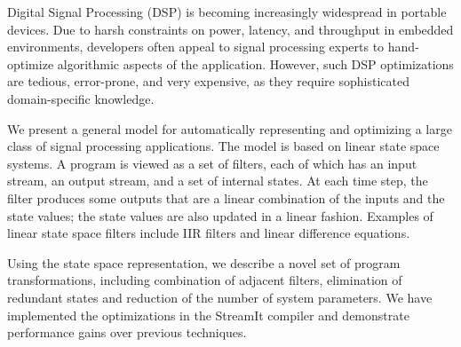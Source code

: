 Digital Signal Processing (DSP) is becoming increasingly wide\-spread
in portable devices. Due to harsh constraints on power, latency, and
throughput in embedded environments, developers often appeal to signal
processing experts to hand-optimize algorithmic aspects of the
application.  However, such DSP optimizations are tedious,
error-prone, and very expensive, as they require sophisticated
domain-specific knowledge.

We present a general model for automatically representing and
optimizing a large class of signal processing applications. The model
is based on linear state space systems. A program is viewed as a set
of filters, each of which has an input stream, an output stream, and a
set of internal states. At each time step, the filter produces some
outputs that are a linear combination of the inputs and the state
values; the state values are also updated in a linear
fashion. Examples of linear state space filters include IIR filters
and linear difference equations.

Using the state space representation, we describe a novel set of
program transformations, including combination of adjacent filters,
elimination of redundant states and reduction of the number of system
parameters. We have implemented the optimizations in the StreamIt
compiler and demonstrate performance gains over previous techniques.
